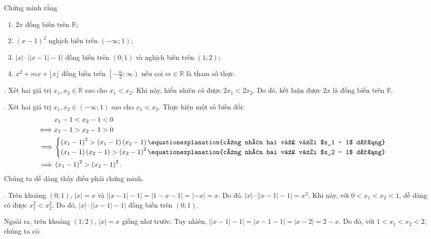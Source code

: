 \exercise Chứng minh rằng
\begin{enumerate}
   \item $2x$ đồng biến trên $\mathbb{R}$;
   \item $(x-1)^2$ nghịch biến trên $\left(-\infty; 1\right)$;
   \item $|x|\cdot \left|\left|x - 1\right| - 1\right|$ đồng biến trên $(0; 1)$ và nghịch biến trên $(1; 2)$;
   \item $x^2 + mx + \lfloor x \rfloor$ đồng biến trên $\left[-\frac{m}{2}; \infty\right)$ nếu coi $m\in\mathbb{R}$ là tham số thực.
\end{enumerate}

\solution

\setcounter{subexercise}{1}
. Xét hai giá trị $x_1, x_2 \in \mathbb{R}$ sao cho $x_1 < x_2$. Khi này, hiển nhiên có được $2x_1 < 2x_2$. Do đó, kết luận được $2x$ là đồng biến trên $\mathbb{R}$.

. Xét hai giá trị $x_1, x_2 \in \left(-\infty; 1\right)$ sao cho $x_1 < x_2$. Thực hiện một số biến đổi:
\begin{align*}
   &x_1 - 1 < x_2 - 1 < 0 \\
   \iff &x_1 - 1 > x_2 - 1 > 0 \\
   \implies &\begin{cases}
      \left(x_1 - 1\right)^2 > \left(x_1 - 1\right)\left(x_2 - 1\right) \equationexplanation{cùng nhân hai vế với $x_1 - 1$ dương}\\
      \left(x_1 - 1\right)\left(x_2 - 1\right) > \left(x_2 - 1\right)^2 \equationexplanation{cùng nhân hai vế với $x_2 - 1$ dương}
   \end{cases} \\
   \implies &\left(x_1 - 1\right)^2 > \left(x_2 - 1\right)^2.
\end{align*}
Chúng ta dễ dàng thấy điều phải chứng minh.

. Trên khoảng $(0; 1)$, $|x| = x$ và $\left|\left|x - 1\right| - 1\right| = \left|1 - x - 1\right| = \left|-x\right| = x$. Do đó, $|x|\cdot \left|\left|x - 1\right| - 1\right| = x^2$. Khi này, với $0 < x_1 < x_2 < 1$, dễ dàng có được $x_1^2 < x_2^2$. Do đó, $|x|\cdot \left|\left|x - 1\right| - 1\right|$ đồng biến trên $(0; 1)$.

Ngoài ra, trên khoảng $(1; 2)$, $|x| = x$ giống như trước. Tuy nhiên, $\left|\left|x - 1\right| - 1\right| = \left|x - 1 - 1\right| = \left|x - 2\right| = 2 - x$. Do đó, với $1 < x_1 < x_2 < 2$, chúng ta có:

